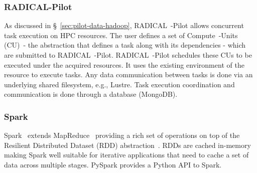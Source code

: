 \subsubsection*{RADICAL-Pilot}

As discussed in \S~\ref{sec:pilot-data-hadoop}, RADICAL~-Pilot allows concurrent task execution on HPC resources.
The user defines a set of Compute~-Units (CU)~- the abstraction that defines a task along with its dependencies - which are submitted to RADICAL~-Pilot.
RADICAL~-Pilot schedules these CUs to be executed under the acquired resources.
It uses the existing environment of the resource to execute tasks.
Any data communication between tasks is done via an underlying shared filesystem, e.g., Lustre.
Task execution coordination and communication is done through a database (MongoDB).


\subsubsection*{Spark}
Spark~\cite{zaharia2010spark} extends MapReduce~\cite{dean2004mapreduce} providing a rich set of operations on top of the Resilient Distributed Dataset (RDD) abstraction~\cite{zaharia2012resilient}.
RDDs are cached in-memory making Spark well suitable for iterative applications that need to cache a set of data across multiple stages.
PySpark provides a Python API to Spark.

